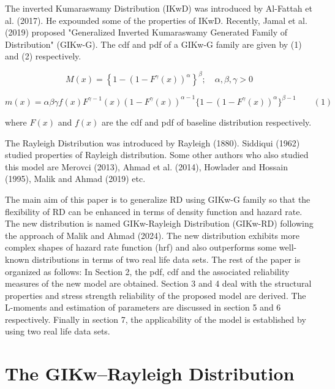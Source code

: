 \documentclass[12pt]{article}
\begin{document}
The inverted Kumaraswamy Distribution (IKwD) was introduced by Al-Fattah et al. (2017).
He expounded some of the properties of IKwD. Recently, Jamal et al. (2019) proposed
"Generalized Inverted Kumaraswamy Generated Family of Distribution" (GIKw-G). The
cdf and pdf of a GIKw-G family are given by (1) and (2) respectively.



\[
M(x) = \left\{1 - \left(1 - F^{\gamma}(x)\right)^{\alpha}\right\}^{\beta}; \quad \alpha,\beta,\gamma > 0
\]



\[
m(x) = \alpha\beta\gamma f(x)F^{\gamma-1}(x)(1 - F^{\gamma}(x))^{\alpha-1}
\{1 - (1 - F^{\gamma}(x))^{\alpha}\}^{\beta-1} \qquad (1)
\]



where \(F(x)\) and \(f(x)\) are the cdf and pdf of baseline distribution respectively.



The Rayleigh Distribution was introduced by Rayleigh (1880). Siddiqui (1962) studied
properties of Rayleigh distribution. Some other authors who also studied this model
are Merovci (2013), Ahmad et al. (2014), Howlader and Hossain (1995), Malik and Ahmad
(2019) etc.



The main aim of this paper is to generalize RD using GIKw-G family so that the
flexibility of RD can be enhanced in terms of density function and hazard rate.
The new distribution is named GIKw-Rayleigh Distribution (GIKw-RD) following the
approach of Malik and Ahmad (2024). The new distribution exhibits more complex
shapes of hazard rate function (hrf) and also outperforms some well-known
distributions in terms of two real life data sets. The rest of the paper is
organized as follows: In Section 2, the pdf, cdf and the associated reliability
measures of the new model are obtained. Section 3 and 4 deal with the structural
properties and stress strength reliability of the proposed model are derived.
The L-moments and estimation of parameters are discussed in section 5 and 6
respectively. Finally in section 7, the applicability of the model is established
by using two real life data sets.



\section{The GIKw–Rayleigh Distribution}
\end{document}
